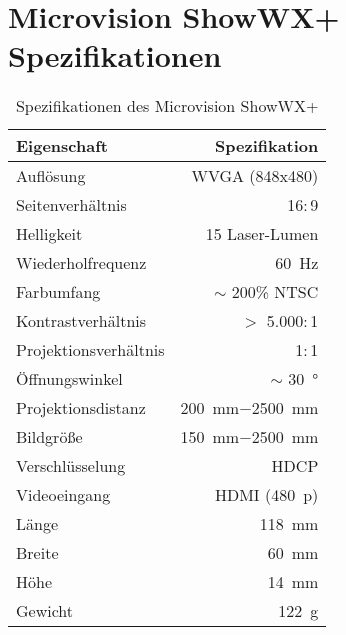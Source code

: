 \section{Microvision ShowWX+ Spezifikationen}
\label{app:projector}
\begin{table}[!ht]
\caption{Spezifikationen des Microvision ShowWX+}
\begin{center}
\vspace{-3mm}
\begin{tabular}{|l|r|}
\hline
\rowcolor{lightgray} Eigenschaft & Spezifikation \\
\hline
Auflösung 	& WVGA (\SI{848}{}$\mathrm{x}$\SI{480}{}) \\
\hline
Seitenverhältnis & \SI{16}{}$:$\SI{9}{} \\
\hline
Helligkeit 	& \SI{15}{} Laser-Lumen \\
\hline
Wiederholfrequenz & \SI{60}{\Hz} \\
\hline
Farbumfang 	& $\sim$ \SI{200}{}\% NTSC \\
\hline
Kontrastverhältnis 	& $>$ \SI{5.000}{}$:$\SI{1}{} \\
\hline
Projektionsverhältnis 	& \SI{1}{}$:$\SI{1}{} \\
\hline
Öffnungswinkel & $\sim$ \SI{30}{°}\\
\hline
Projektionsdistanz 	& \SI{200}{\milli\meter}$-$\SI{2500}{\milli\meter} \\
\hline
Bildgröße 	& \SI{150}{\milli\meter}$-$\SI{2500}{\milli\meter} \\
\hline
Verschlüsselung 	& HDCP \\
\hline
Videoeingang & HDMI (\SI{480}{p}) \\
\hline
Länge & \SI{118}{\milli\meter}\\
\hline
Breite & \SI{60}{\milli\meter}\\
\hline
Höhe & \SI{14}{\milli\meter}\\
\hline
Gewicht 	& \SI{122}{\gram} \\
\hline
\end{tabular}
\end{center}
\label{tab:landmarks_f1}
\end{table}


